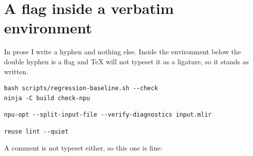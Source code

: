 \section{A flag inside a verbatim environment}

In prose I write a hyphen and nothing else. Inside the environment below the
double hyphen is a flag and TeX will not typeset it as a ligature, so it
stands as written.

\begin{verbatim}
bash scripts/regression-baseline.sh --check
ninja -C build check-npu
\end{verbatim}

\begin{lstlisting}
npu-opt --split-input-file --verify-diagnostics input.mlir
\end{lstlisting}

\begin{verbatim}
reuse lint --quiet
\end{verbatim}

A comment is not typeset either, so this one is fine: %
